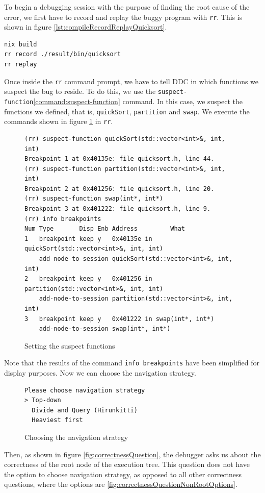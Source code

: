 To begin a debugging session with the purpose of finding the root cause of the error, we first have to record and replay the buggy program with \verb|rr|. This is shown in figure \ref{lst:compileRecordReplayQuicksort}.
\begin{lstlisting}[language=bash, caption={Compiling, recording and replaying quickSort}, frame=tb, label={lst:compileRecordReplayQuicksort}]
nix build
rr record ./result/bin/quicksort
rr replay
\end{lstlisting}
Once inside the \verb|rr| command prompt, we have to tell DDC in which functions we suspect the bug to reside.
To do this, we use the \verb|suspect-function|\ref{command:suspect-function} command. In this case, we suspect the functions we defined, that is, \verb|quickSort|, \verb|partition| and \verb|swap|. We execute the commands shown in figure \ref{fig:suspecting-functions} in \verb|rr|.
\begin{figure}[h]
    \centering
    \caption{Setting the suspect functions}
    \label{fig:suspecting-functions}
    \begin{verbatim}
(rr) suspect-function quickSort(std::vector<int>&, int, int)
Breakpoint 1 at 0x40135e: file quicksort.h, line 44.
(rr) suspect-function partition(std::vector<int>&, int, int) 
Breakpoint 2 at 0x401256: file quicksort.h, line 20.
(rr) suspect-function swap(int*, int*) 
Breakpoint 3 at 0x401222: file quicksort.h, line 9.
(rr) info breakpoints
Num Type       Disp Enb Address         What
1   breakpoint keep y   0x40135e in quickSort(std::vector<int>&, int, int)
    add-node-to-session quickSort(std::vector<int>&, int, int)
2   breakpoint keep y   0x401256 in partition(std::vector<int>&, int, int)
    add-node-to-session partition(std::vector<int>&, int, int)
3   breakpoint keep y   0x401222 in swap(int*, int*)
    add-node-to-session swap(int*, int*)
    \end{verbatim}
\end{figure}
Note that the results of the command \verb|info breakpoints| have been simplified for display purposes.
Now we can choose the navigation strategy.
\begin{figure}[h]
    \centering
    \caption{Choosing the navigation strategy}
    \label{fig:navigationsStrategyPrompt}
    \begin{verbatim}
Please choose navigation strategy
> Top-down                                                                                                                                            
  Divide and Query (Hirunkitti)                                                                                                                       
  Heaviest first
    \end{verbatim}
\end{figure}
Then, as shown in figure \ref{fig:correctnessQuestion}, the debugger asks us about the correctness of the root node of the execution tree. This question does not have the option to choose navigation strategy, as opposed to all other correctness questions, where the options are \ref{fig:correctnessQuestionNonRootOptions}. 

